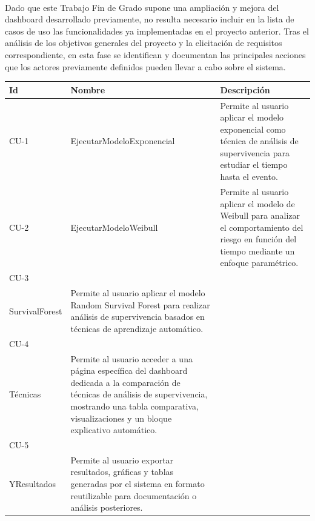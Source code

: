 \paragraph*{}Dado que este Trabajo Fin de Grado supone una ampliación y mejora del dashboard desarrollado previamente, no resulta necesario incluir en la lista de casos de uso las funcionalidades ya implementadas en el proyecto anterior. Tras el análisis de los objetivos generales del proyecto y la elicitación de requisitos correspondiente, en esta fase se identifican y documentan las principales acciones que los actores previamente definidos pueden llevar a cabo sobre el sistema.
\begin{table}[H]
\centering
\small
\begin{tabularx}{\textwidth}{|p{1.1cm}|>{\raggedright\arraybackslash}p{4.9cm}|X|}
\hline
\textbf{Id} & \textbf{Nombre} & \textbf{Descripción} \\ \hline

CU-1 & EjecutarModeloExponencial & 
Permite al usuario aplicar el modelo exponencial como técnica de análisis de supervivencia para estudiar el tiempo hasta el evento. \\ \hline

CU-2 & EjecutarModeloWeibull & 
Permite al usuario aplicar el modelo de Weibull para analizar el comportamiento del riesgo en función del tiempo mediante un enfoque paramétrico. \\ \hline

CU-3 & \begin{tabular}[t]{@{}l@{}}EjecutarRandom\\SurvivalForest\end{tabular} & 
Permite al usuario aplicar el modelo Random Survival Forest para realizar análisis de supervivencia basados en técnicas de aprendizaje automático. \\ \hline

CU-4 & \begin{tabular}[t]{@{}l@{}}ConsultarComparación\\Técnicas\end{tabular} & 
Permite al usuario acceder a una página específica del dashboard dedicada a la comparación de técnicas de análisis de supervivencia, mostrando una tabla comparativa, visualizaciones y un bloque explicativo automático. \\ \hline

CU-5 & \begin{tabular}[t]{@{}l@{}}ExportarInformes\\YResultados\end{tabular} & 
Permite al usuario exportar resultados, gráficas y tablas generadas por el sistema en formato reutilizable para documentación o análisis posteriores. \\ \hline


\end{tabularx}
\end{table}
